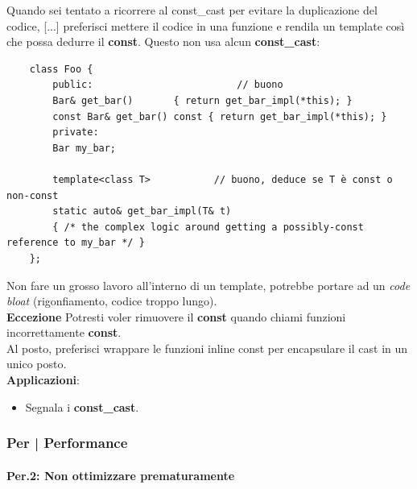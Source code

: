 \textsf{\small Quando sei tentato a ricorrere al const\_cast per evitare la duplicazione del codice, [...] preferisci mettere il codice in una funzione e rendila un template così che possa dedurre il \textbf{const}. Questo non usa alcun \textbf{const\_cast}: }

\begin{lstlisting}
	class Foo {
		public:                         // buono
		Bar& get_bar()       { return get_bar_impl(*this); }
		const Bar& get_bar() const { return get_bar_impl(*this); }
		private:
		Bar my_bar;
		
		template<class T>           // buono, deduce se T è const o non-const
		static auto& get_bar_impl(T& t)
		{ /* the complex logic around getting a possibly-const reference to my_bar */ }
	};
\end{lstlisting}

\textsf{\small Non fare un grosso lavoro all'interno di un template, potrebbe portare ad un \emph{code bloat} (rigonfiamento, codice troppo lungo).} \\ %

\textsf{\small \textbf{Eccezione} Potresti voler rimuovere il \textbf{const} quando chiami funzioni incorrettamente \textbf{const}.} \\ %
\textsf{\small Al posto, preferisci wrappare le funzioni inline const per encapsulare il cast in un unico posto.} \\ %

\textsf{\small \textbf{Applicazioni}: }

\begin{itemize}
	\item \textsf{\small Segnala i \textbf{const\_cast}.}
\end{itemize}


\subsubsection{Per | Performance}

\paragraph{Per.2: Non ottimizzare prematuramente}

